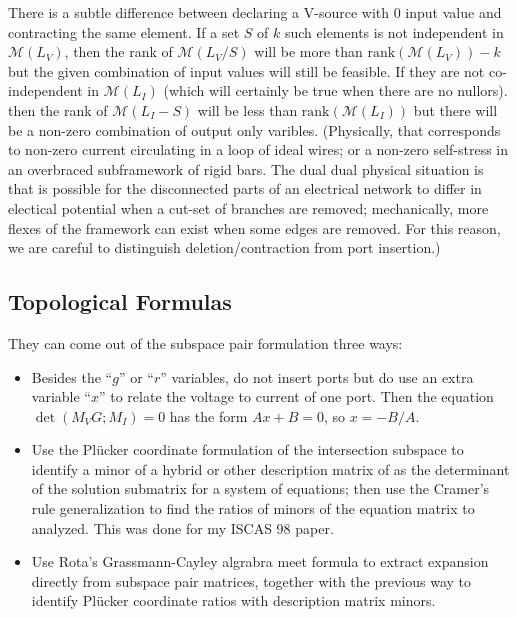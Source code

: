 \documentclass{article}
\newcommand{\extra}[1]{{\small{#1}}}
\begin{document}
\extra{ There is a subtle difference between declaring a V-source with 0
input value and contracting the same element.  If a set $S$ 
of $k$ such elements
is not independent in $\mathcal{M}(L_V)$, then the rank of $\mathcal{M}(L_V/S)$
will be more than
$\mbox{rank}(\mathcal{M}(L_V))-k$ but the given combination of input values
will still be feasible.  If they are not co-independent in
$\mathcal{M}(L_I)$ (which will certainly be true when there are no nullors).
then the rank of $\mathcal{M}(L_I-S)$ will be less than 
$\mbox{rank}(\mathcal{M}(L_I))$ but there will be a non-zero combination of
output only varibles.  (Physically, that corresponds to non-zero current 
circulating in a loop of ideal wires; or a non-zero self-stress in an
overbraced subframework of rigid bars.  The dual dual physical situation
is that is possible for the disconnected parts of an electrical network
to differ in electical potential when a cut-set of branches are removed;
mechanically, more flexes of the framework can exist when some edges are
removed. For this reason, we are careful to distinguish deletion/contraction
from port insertion.)}

\extra{
\subsection{Topological Formulas}

They can come out of the subspace pair formulation three ways:
\begin{itemize}
\item  Besides the ``$g$'' or ``$r$'' variables, do not insert ports but
do use an extra variable ``$x$'' to relate the voltage to current of one port.
Then the equation $\det(M_VG;M_I)=0$ has the form $Ax+B=0$, so $x=-B/A$.
\item Use the Pl\"{u}cker coordinate formulation of the intersection subspace to 
identify a minor of a hybrid or other description matrix of as the determinant
of the solution submatrix for a system of equations; then use the Cramer's
rule generalization to find the ratios of minors of the equation 
matrix to analyzed.  
This was done for my ISCAS 98 paper.
\item Use Rota's Grassmann-Cayley algrabra meet formula to extract expansion
directly from subspace pair matrices, together with the previous way to
identify Pl\"{u}cker coordinate ratios with description matrix minors.
\end{itemize}

}
\end{document}
